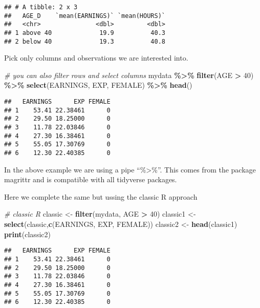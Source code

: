 \documentclass[
]{article}
\newenvironment{Shaded}{\begin{snugshade}}{\end{snugshade}}
\newcommand{\CommentTok}[1]{\textcolor[rgb]{0.56,0.35,0.01}{\textit{#1}}}
\newcommand{\DecValTok}[1]{\textcolor[rgb]{0.00,0.00,0.81}{#1}}
\newcommand{\FunctionTok}[1]{\textcolor[rgb]{0.13,0.29,0.53}{\textbf{#1}}}
\newcommand{\NormalTok}[1]{#1}
\newcommand{\OtherTok}[1]{\textcolor[rgb]{0.56,0.35,0.01}{#1}}
\newcommand{\SpecialCharTok}[1]{\textcolor[rgb]{0.81,0.36,0.00}{\textbf{#1}}}
\begin{document}
\begin{verbatim}
## # A tibble: 2 x 3
##   AGE_D    `mean(EARNINGS)` `mean(HOURS)`
##   <chr>               <dbl>         <dbl>
## 1 above 40             19.9          40.3
## 2 below 40             19.3          40.8
\end{verbatim}

Pick only columns and observations we are interested into.

\begin{Shaded}
\begin{Highlighting}[]
\CommentTok{\# you can also \textquotesingle{}filter\textquotesingle{} rows and \textquotesingle{}select\textquotesingle{} columns}
\NormalTok{mydata }\SpecialCharTok{\%\textgreater{}\%} 
  \FunctionTok{filter}\NormalTok{(AGE }\SpecialCharTok{\textgreater{}} \DecValTok{40}\NormalTok{) }\SpecialCharTok{\%\textgreater{}\%}
  \FunctionTok{select}\NormalTok{(EARNINGS, EXP, FEMALE) }\SpecialCharTok{\%\textgreater{}\%}
  \FunctionTok{head}\NormalTok{()}
\end{Highlighting}
\end{Shaded}

\begin{verbatim}
##   EARNINGS      EXP FEMALE
## 1    53.41 22.38461      0
## 2    29.50 18.25000      0
## 3    11.78 22.03846      0
## 4    27.30 16.38461      0
## 5    55.05 17.30769      0
## 6    12.30 22.40385      0
\end{verbatim}

In the above example we are using a pipe ``\%\textgreater\%''. This
comes from the package magrittr and is compatible with all tidyverse
packages.

Here we complete the same but ussing the classic R approach

\begin{Shaded}
\begin{Highlighting}[]
\CommentTok{\# classic R}
\NormalTok{classic }\OtherTok{\textless{}{-}} \FunctionTok{filter}\NormalTok{(mydata, AGE }\SpecialCharTok{\textgreater{}} \DecValTok{40}\NormalTok{)}
\NormalTok{classic1 }\OtherTok{\textless{}{-}} \FunctionTok{select}\NormalTok{(classic,}\FunctionTok{c}\NormalTok{(EARNINGS, EXP, FEMALE))}
\NormalTok{classic2 }\OtherTok{\textless{}{-}} \FunctionTok{head}\NormalTok{(classic1)}
\FunctionTok{print}\NormalTok{(classic2)}
\end{Highlighting}
\end{Shaded}

\begin{verbatim}
##   EARNINGS      EXP FEMALE
## 1    53.41 22.38461      0
## 2    29.50 18.25000      0
## 3    11.78 22.03846      0
## 4    27.30 16.38461      0
## 5    55.05 17.30769      0
## 6    12.30 22.40385      0
\end{verbatim}
\end{document}
